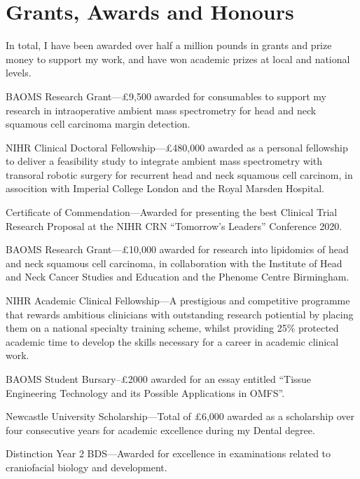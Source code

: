 \section*{Grants, Awards and Honours}

In total, I have been awarded over half a million pounds in grants and prize money to support my work, and have won academic prizes at local and national levels.

 BAOMS Research Grant---\pounds9,500 awarded for consumables to support my research in intraoperative ambient mass spectrometry for head and neck squamous cell carcinoma margin detection.

 NIHR Clinical Doctoral Fellowship---\pounds480,000 awarded as a personal fellowship to deliver a feasibility study to integrate ambient mass spectrometry with transoral robotic surgery for recurrent head and neck squamous cell carcinom, in assocition with Imperial College London and the Royal Marsden Hospital.

 Certificate of Commendation---Awarded for presenting the best Clinical Trial Research Proposal at the NIHR CRN ``Tomorrow's Leaders'' Conference 2020.

 BAOMS Research Grant---\pounds10,000 awarded for research into lipidomics of head and neck squamous cell carcinoma, in collaboration with the Institute of Head and Neck Cancer Studies and Education and the Phenome Centre Birmingham.

 NIHR Academic Clinical Fellowship---A prestigious and competitive programme that rewards ambitious clinicians with outstanding research potiential by placing them on a national specialty training scheme, whilst providing 25\% protected academic time to develop the skills necessary for a career in academic clinical work.

 BAOMS Student Bursary--£2000 awarded for an essay entitled “Tissue Engineering Technology and its Possible Applications in OMFS”.

 Newcastle University Scholarship---Total of \pounds6,000 awarded as a scholarship over four consecutive years for academic excellence during my Dental degree.

 Distinction Year 2 BDS---Awarded for excellence in examinations related to craniofacial biology and development.
